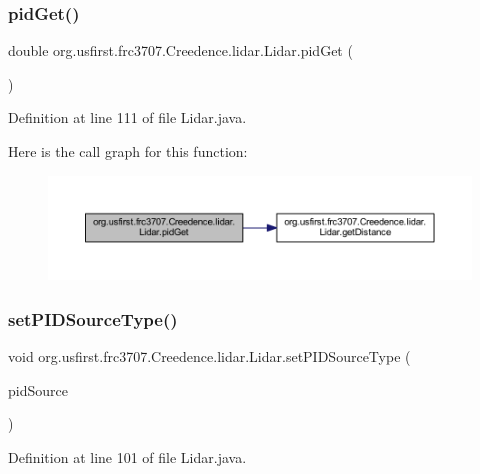 \subsubsection{\texorpdfstring{pidGet()}{pidGet()}}
{\footnotesize\ttfamily double org.\+usfirst.\+frc3707.\+Creedence.\+lidar.\+Lidar.\+pid\+Get (\begin{DoxyParamCaption}{ }\end{DoxyParamCaption})}



Definition at line 111 of file Lidar.\+java.

Here is the call graph for this function\+:
\nopagebreak
\begin{figure}[H]
\begin{center}
\leavevmode
\includegraphics[width=350pt]{classorg_1_1usfirst_1_1frc3707_1_1_creedence_1_1lidar_1_1_lidar_ab90708315a525426d46750ecb2f13e19_cgraph}
\end{center}
\end{figure}
\mbox{\label{classorg_1_1usfirst_1_1frc3707_1_1_creedence_1_1lidar_1_1_lidar_a60d9f61d900699581636f3478d2c11f4}} 
\subsubsection{\texorpdfstring{setPIDSourceType()}{setPIDSourceType()}}
{\footnotesize\ttfamily void org.\+usfirst.\+frc3707.\+Creedence.\+lidar.\+Lidar.\+set\+P\+I\+D\+Source\+Type (\begin{DoxyParamCaption}\item[{P\+I\+D\+Source\+Type}]{pid\+Source }\end{DoxyParamCaption})}



Definition at line 101 of file Lidar.\+java.



